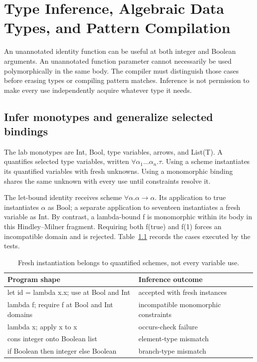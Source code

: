 \chapter{Type Inference, Algebraic Data Types, and Pattern Compilation}
\label{ch:functional-types-patterns}

An unannotated identity function can be useful at both integer and Boolean arguments.
An unannotated function parameter cannot necessarily be used polymorphically in the same body.
The compiler must distinguish those cases before erasing types or compiling pattern matches.
Inference is not permission to make every use independently acquire whatever type it needs.

\section{Infer monotypes and generalize selected bindings}
\label{sec:ch90-schemes}
The lab monotypes are Int, Bool, type variables, arrows, and List(T).
A  quantifies selected type variables, written $\forall\alpha_1\ldots\alpha_n.\tau$.
Using a scheme instantiates its quantified variables with fresh unknowns.
Using a monomorphic binding shares the same unknown with every use until constraints resolve it.

The let-bound identity receives scheme $\forall\alpha.\alpha\to\alpha$.
Its application to true instantiates $\alpha$ as Bool; a separate application to seventeen instantiates a fresh variable as Int.
By contrast, a lambda-bound f is monomorphic within its body in this Hindley--Milner fragment.
Requiring both f(true) and f(1) forces an incompatible domain and is rejected.
Table~\ref{tab:ch90-inference} records the cases executed by the tests.

\begin{table}[htbp]
\caption{Fresh instantiation belongs to quantified schemes, not every variable use.}
\label{tab:ch90-inference}
\centering
\begin{tabular}{ll}
\toprule
Program shape & Inference outcome \\
\midrule
let id = lambda x.x; use at Bool and Int & accepted with fresh instances \\
lambda f; require f at Bool and Int domains & incompatible monomorphic constraints \\
lambda x; apply x to x & occurs-check failure \\
cons integer onto Boolean list & element-type mismatch \\
if Boolean then integer else Boolean & branch-type mismatch \\
\bottomrule
\end{tabular}
\end{table}


